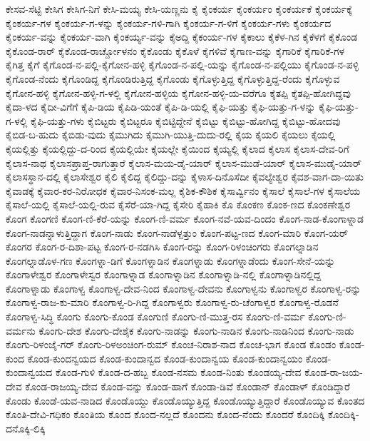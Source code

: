 ಕೇಸವ-ಸೆಟ್ಟಿ
ಕೇಸಿಗ
ಕೇಸಿಗ-ನಿಗೆ
ಕೇಸಿ-ಮಯ್ಯ
ಕೇಸಿ-ಯಣ್ಣನು
ಕೈ
ಕೈಂಕರ್ಯ
ಕೈಂಕರ್ಯಂ
ಕೈಂಕರ್ಯಕೆ
ಕೈಂಕರ್ಯಕ್ಕೆ
ಕೈಂಕರ್ಯ-ಗಳ
ಕೈಂಕರ್ಯ-ಗ-ಳನ್ನು
ಕೈಂಕರ್ಯ-ಗಳಿ-ಗಾಗಿ
ಕೈಂಕರ್ಯ-ಗ-ಳಿಗೆ
ಕೈಂಕರ್ಯ-ಗಳು
ಕೈಂಕರ್ಯದ
ಕೈಂಕರ್ಯ-ವನ್ನು
ಕೈಂಕರ್ಯ-ವಾಗಿ
ಕೈಂಕರ್ಯ್ಯ-ವನ್ನು
ಕೈಅದ್ದಿ
ಕೈಕಂರ್ಯ-ಗಳ
ಕೈಕಾಲು
ಕೈಕೆಳ-ಗಿನ
ಕೈಕೆಳಗೆ
ಕೈಕೊಂಡ
ಕೈಕೊಂಡ-ರಾರ್
ಕೈಕೊಂಡ-ರಾರ್ಚ್ಚೋಳನಂ
ಕೈಕೊಂಡು
ಕೈಕೊಳೆ
ಕೈಗಳಿವೆ
ಕೈಗಾಣ-ವನ್ನು
ಕೈಗಾರಿಕೆ
ಕೈಗಾರಿಕೆ-ಗಳ
ಕೈಗಿತ್ತ
ಕೈಗೆ
ಕೈಗೊಂಡ-ನ-ಪಲ್ಲಿ-ಕೈಗೋನ-ಹಳ್ಳಿ
ಕೈಗೊಂಡ-ನ-ಪಲ್ಲಿ-ಯನ್ನು
ಕೈಗೊಂಡ-ನ-ಪಲ್ಲಿಯು
ಕೈಗೊಂಡ-ನ-ಪಳ್ಳಿ
ಕೈಗೊಂಡ-ನೆಂದು
ಕೈಗೊಂಡಿದ್ದ
ಕೈಗೊಂಡಿರುತ್ತಿದ್ದ
ಕೈಗೊಂಡು
ಕೈಗೊಳ್ಳುತ್ತಿದ್ದ
ಕೈಗೊಳ್ಳುತ್ತಿದ್ದ-ರೆಂದು
ಕೈಗೊಳ್ಳುವ
ಕೈಗೋನ-ಹಳ್ಳಿ
ಕೈಗೋನ-ಹಳ್ಳಿ-ಗ-ಳಲ್ಲಿ
ಕೈಗೋನ-ಹಳ್ಳಿಯ
ಕೈಗೋನ-ಹಳ್ಳಿ-ಯ-ವರೆಗೂ
ಕೈತಪ್ಪಿ
ಕೈತಪ್ಪಿ-ಹೋಗಿದ್ದವು
ಕೈದಾ-ಳದ
ಕೈದೀ-ವಿಗೆಗೆ
ಕೈಪಿ-ಡಿಯ
ಕೈಪಿಡಿ-ಯಂತೆ
ಕೈಪಿ-ಡಿ-ಯಲ್ಲಿ
ಕೈಫಿ-ಯತ್ತು
ಕೈಫಿ-ಯತ್ತು-ಗ-ಳನ್ನು
ಕೈಫಿ-ಯತ್ತು-ಗ-ಳಲ್ಲಿ
ಕೈಫಿ-ಯತ್ತು-ಗಳು
ಕೈಬಿಟ್ಟರು
ಕೈಬಿಟ್ಟರೂ
ಕೈಬಿಟ್ಟಿದ್ದೇನೆ
ಕೈಬಿಟ್ಟು
ಕೈಬಿಟ್ಟು-ಹೋಗಿದ್ದ
ಕೈಬಿಟ್ಟು-ಹೋದವು
ಕೈಬಿಡ-ಬ-ಹುದು
ಕೈಬಿಡು-ವುದು
ಕೈಮುಗಿದು
ಕೈಮುಗಿ-ಯುತ್ತಿ-ದುದು-ರಲ್ಲಿ
ಕೈಯ
ಕೈಯಲಿ
ಕೈಯಲು
ಕೈಯಲ್ಲಿ
ಕೈಯಲ್ಲಿತ್ತು
ಕೈಯಲ್ಲಿದ್ದು-ದ-ರಿಂದ
ಕೈಯಲ್ಲಿಯೇ
ಕೈಯಲ್ಲೇ
ಕೈಯಿಂದ
ಕೈಯ್ಯಲ್ಲಿ
ಕೈಲಾದ
ಕೈಲಾಸ
ಕೈಲಾಸ-ದೇವ-ರಿಗೆ
ಕೈಲಾಸ-ನಾಥ
ಕೈಲಾಸಪ್ರಾಪ್ತ-ರಾಗುತ್ತಾರೆ
ಕೈಲಾಸ-ಮಯ-ಡೈ-ಯಾರ್
ಕೈಲಾಸ-ಮುಡೆ-ಯಾರ್
ಕೈಲಾಸ-ಮುಡೈ-ಯಾರ್
ಕೈಲಾಸಸ್ಥಾನ-ದಲ್ಲಿ
ಕೈಲಾಸೇಶ್ವರ
ಕೈಲಿ
ಕೈಲಿದ್ದ
ಕೈಲಿದ್ದು-ದನ್ನು
ಕೈಳಾಸ-ದಿನೊಸೆದೀ
ಕೈವಲ್ಯೇಶ್ವರ
ಕೈವಶ-ವಾಗ-ದಾ-ಯಿತು
ಕೈವಾಡಕ್ಕೆ
ಕೈವಾರ-ಕರ-ನಿರೋಧಕ
ಕೈವಾರ-ನಿಸಂಕ-ಮಲ್ಲ
ಕೈಶಿಕ-ಕೌಶಿಕ
ಕೈಸಾರ್ವ್ವಿನಂ
ಕೈಸಾಲೆ
ಕೈಸಾಲೆ-ಗಳ
ಕೈಸಾಲೆಯ
ಕೈಸಾಲೆ-ಯಲ್ಲಿ
ಕೈಸಾಲೆ-ಯಲ್ಲಿ-ರುವ
ಕೈಸೆರೆ-ಯಾ-ಗಿದ್ದ
ಕೈಸೇರಿ
ಕೈಹಾಕಿ
ಕೊ
ಕೊಂಕಣ
ಕೊಂಕ-ಣದ
ಕೊಂಕಣೇಶ್ವರ
ಕೊಂಗ
ಕೊಂಗಣಿ
ಕೊಂಗ-ಣಿ-ಕೆರೆ-ಯನ್ನು
ಕೊಂಗ-ಣಿ-ವರ್ಮ
ಕೊಂಗ-ನವೆ-ಯವ-ದಿಂದಂ
ಕೊಂಗ-ನಾಡ-ಕೊಂಗಾಳ್ನಾಡ
ಕೊಂಗ-ನಾಡನ್ನಾಳುತ್ತಿದ್ದಾಗ
ಕೊಂಗ-ನಾಡು
ಕೊಂಗ-ನಾಡೆಳ್ಪತ್ತುಂ
ಕೊಂಗ-ಪಟ್ಟ-ಣದ
ಕೊಂಗ-ಮಾರಿ
ಕೊಂಗ-ಯರ್
ಕೊಂಗರ
ಕೊಂಗ-ರ-ದಿಶಾ-ಪಟ್ಟ
ಕೊಂಗ-ರ-ನಡಗಿಸಿ
ಕೊಂಗ-ರನ್ನು
ಕೊಂಗ-ರಿಳಂಚಿಂಗರು
ಕೊಂಗಲ್ನಾಡಿನ
ಕೊಂಗಲ್ನಾಡೊಳ-ಗಣ
ಕೊಂಗಳ್ನಾ-ಡಿಗೆ
ಕೊಂಗಳ್ನಾಡಿನ
ಕೊಂಗಳ್ನಾಡು
ಕೊಂಗಳ್ನಾಡೆಂದು
ಕೊಂಗ-ಸೇನೆ-ಯನ್ನು
ಕೊಂಗಾಳೇಶ್ವರ
ಕೊಂಗಾಳೇಸ್ವರ
ಕೊಂಗಾಳ್ನಾಡ
ಕೊಂಗಾಳ್ನಾಡಿನ
ಕೊಂಗಾಳ್ನಾಡಿ-ನಲ್ಲಿ
ಕೊಂಗಾಳ್ನಾಡಿನಲ್ಲಿದ್ದ
ಕೊಂಗಾಳ್ನಾಡು
ಕೊಂಗಾಳ್ವ
ಕೊಂಗಾಳ್ವ-ದೇವ-ನಿಂದ
ಕೊಂಗಾಳ್ವ-ದೇವನು
ಕೊಂಗಾಳ್ವನು
ಕೊಂಗಾಳ್ವರ
ಕೊಂಗಾಳ್ವ-ರನ್ನು
ಕೊಂಗಾಳ್ವ-ರಾಜ-ಕು-ಮಾರಿ
ಕೊಂಗಾಳ್ವ-ರಿ-ಗಿದ್ದ
ಕೊಂಗಾಳ್ವರು
ಕೊಂಗಾಳ್ವ-ರು-ಚೆಂಗಾಳ್ವರ
ಕೊಂಗಾಳ್ವ-ರೊಡನೆ
ಕೊಂಗಾಳ್ವ-ಸಿದ್ಧಿ
ಕೊಂಗು
ಕೊಂಗು-ಕೊಂಡ
ಕೊಂಗುಣಿ
ಕೊಂಗು-ಣಿ-ಮುತ್ತ-ರಸ
ಕೊಂಗು-ಣಿ-ವರ್ಮ
ಕೊಂಗು-ಣಿ-ವರ್ಮನು
ಕೊಂಗು-ದೇಶ
ಕೊಂಗು-ದೇಶೈಕ
ಕೊಂಗು-ನಾಡನ್ನು
ಕೊಂಗು-ನಾಡಿನ
ಕೊಂಗು-ನಾಡಿನಿಂದ
ಕೊಂಗು-ನಾಡು
ಕೊಂಗು-ರಿಳಂಜೈ-ಗರ್
ಕೊಂಗು-ರಿಳಅಂಚಿಂಗ-ರುಮ್
ಕೊಂಚ-ನಿರಾಶ-ನಾದ
ಕೊಂಚ-ಭಾಗ
ಕೊಂಡ
ಕೊಂಡಂ
ಕೊಂಡ-ಕುಂದ
ಕೊಂಡ-ಕುಂದನ್ವಯದ
ಕೊಂಡ-ಕುಂದಾನ್ವದ
ಕೊಂಡ-ಕುಂದಾನ್ವಯ
ಕೊಂಡ-ಕುಂದಾನ್ವಯಂ
ಕೊಂಡ-ಕುಂದಾನ್ವಯದ
ಕೊಂಡ-ಗುಳಿ
ಕೊಂಡ-ದ-ಹಬ್ಬ
ಕೊಂಡ-ನಸಮ
ಕೊಂಡ-ನಿಂತು
ಕೊಂಡಯ್ಯ-ದೇವ
ಕೊಂಡ-ರಾ-ಜಯ-ದೇವ
ಕೊಂಡ-ರಾಜಯ್ಯ-ದೇವ
ಕೊಂಡ-ವನ್ನು
ಕೊಂಡ-ಹಾಗೆ
ಕೊಂಡಾ-ಡಿವೆ
ಕೊಂಡಾನ್
ಕೊಂಡಾಳ್
ಕೊಂಡಿದ್ದಾರೆ
ಕೊಂಡು
ಕೊಂಡೆ-ಯವ-ನಾಡಿದ
ಕೊಂಡೊಯ್ದು
ಕೊಂಡೊಯ್ಯುತ್ತಿದ್ದ
ಕೊಂಡೊಯ್ಯುತ್ತಿದ್ದಾರೆ
ಕೊಂಡೊಯ್ಯುವ
ಕೊಂತದ
ಕೊಂತಿ-ದೇವಿ-ಗಧಿಕಂ
ಕೊಂತಿಯ
ಕೊಂದ
ಕೊಂದ-ನಲ್ಲದೆ
ಕೊಂದನು
ಕೊಂದ-ನೆಂದು
ಕೊಂದರೆ
ಕೊಂದಿಕ್ಕಿ
ಕೊಂದಿಕ್ಕಿ-ದನೊಕ್ಕಿ-ಲಿಕ್ಕಿ
